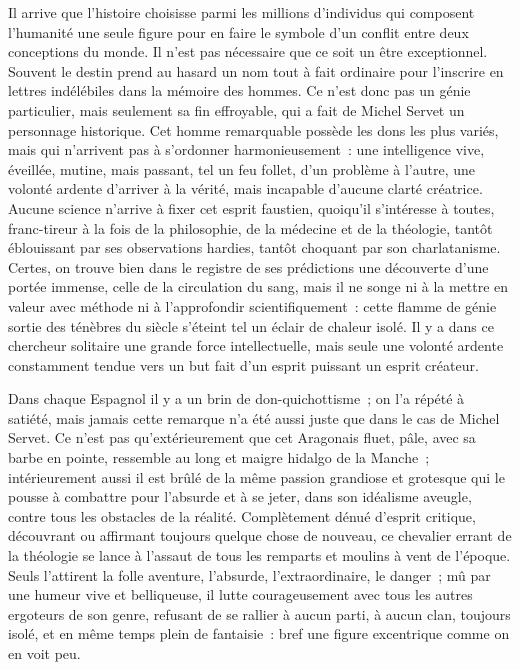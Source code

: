 \documentclass[french,twoside]{book} %
\newcommand\chaptercont{} %
\begin{document}
\chaptercont
\noindent Il arrive que l’histoire choisisse parmi les millions d’individus qui composent l’humanité une seule figure pour en faire le symbole d’un conflit entre deux conceptions du monde. Il n’est pas nécessaire que ce soit un être exceptionnel. Souvent le destin prend au hasard un nom tout à fait ordinaire pour l’inscrire en lettres indélébiles dans la mémoire des hommes. Ce n’est donc pas un génie particulier, mais seulement sa fin effroyable, qui a fait de Michel Servet un personnage historique. Cet homme remarquable possède les dons les plus variés, mais qui n’arrivent pas à s’ordonner harmonieusement : une intelligence vive, éveillée, mutine, mais passant, tel un feu follet, d’un problème à l’autre, une volonté ardente d’arriver à la vérité, mais incapable d’aucune clarté créatrice. Aucune science n’arrive à fixer cet esprit faustien, quoiqu’il s’intéresse à toutes, franc-tireur à la fois de la philosophie, de la médecine et de la théologie, tantôt éblouissant par ses observations hardies, tantôt choquant par son charlatanisme. Certes, on trouve bien dans le registre de ses prédictions une découverte d’une portée immense, celle de la circulation du sang, mais il ne songe ni à la mettre en valeur avec méthode ni à l’approfondir scientifiquement : cette flamme de génie sortie des ténèbres du siècle s’éteint tel un éclair de chaleur isolé. Il y a dans ce chercheur solitaire une grande force intellectuelle, mais seule une volonté ardente constamment tendue vers un but fait d’un esprit puissant un esprit créateur.\par
Dans chaque Espagnol il y a un brin de don-quichottisme ; on l’a répété à satiété, mais jamais cette remarque n’a été aussi juste que dans le cas de Michel Servet. Ce n’est pas qu’extérieurement que cet Aragonais fluet, pâle, avec sa barbe en pointe, ressemble au long et maigre hidalgo de la Manche ; intérieurement aussi il est brûlé de la même passion grandiose et grotesque qui le pousse à combattre pour l’absurde et à se jeter, dans son idéalisme aveugle, contre tous les obstacles de la réalité. Complètement dénué d’esprit critique, découvrant ou affirmant toujours quelque chose de nouveau, ce chevalier errant de la théologie se lance à l’assaut de tous les remparts et moulins à vent de l’époque. Seuls l’attirent la folle aventure, l’absurde, l’extraordinaire, le danger ; mû par une humeur vive et belliqueuse, il lutte courageusement avec tous les autres ergoteurs de son genre, refusant de se rallier à aucun parti, à aucun clan, toujours isolé, et en même temps plein de fantaisie : bref une figure excentrique comme on en voit peu.\par
\end{document}
